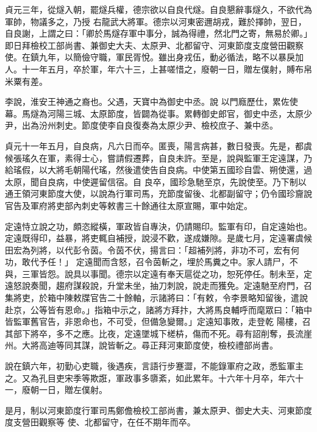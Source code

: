 \begin{pinyinscope}
 貞元三年，從燧入朝，罷燧兵權，德宗欲以自良代燧。自良懇辭事燧久，不欲代為軍帥，物議多之，乃授
 右龍武大將軍。德宗以河東密邇胡戎，難於擇帥，翌日，自良謝，上謂之曰：「卿於馬燧存軍中事分，誠為得禮，然北門之寄，無易於卿。」即日拜檢校工部尚書、兼御史大夫、太原尹、北都留守、河東節度支度營田觀察使。在鎮九年，以簡儉守職，軍民胥悅。雖出身戎伍，動必循法，略不以暴戾加人。十一年五月，卒於軍，年六十三，上甚嗟惜之，廢朝一日，贈左僕射，賻布帛米粟有差。



 李說，淮安王神通之裔也。父遇，天寶中為御史中丞。說
 以門廕歷仕，累佐使幕。馬燧為河陽三城、太原節度，皆闢為從事。累轉御史郎官，御史中丞，太原少尹，出為汾州刺史。節度使李自良復奏為太原少尹、檢校庶子、兼中丞。



 貞元十一年五月，自良病，凡六日而卒。匿喪，陽言病甚，數日發喪。先是，都虞候張瑤久在軍，素得士心，嘗請假遷葬，自良未許。至是，說與監軍王定遠謀，乃給瑤假，以大將毛朝陽代瑤，然後遣使告自良病。中使第五國珍自雲、朔使還，過太原，聞自良病，中使遲留信宿。自
 良卒，國珍急馳至京，先說使至。乃下制以通王領河東節度大使，以說為行軍司馬，充節度留後、北都副留守；仍令國珍齎說官告及軍府將吏部內刺史等敕書三十餘通往太原宣賜，軍中始定。



 定遠恃立說之功，頗恣縱橫，軍政皆自專決，仍請賜印。監軍有印，自定遠始也。定遠既得印，益暴，將吏輒自補授，說浸不歡，遂成嫌隙。是歲七月，定遠署虞候田宏為列將，以代彭令茵。令茵不伏，揚言曰：「超補列將，非功不可，宏有何功，敢代予任！」
 定遠聞而含怒，召令茵斬之，埋於馬糞之中。家人請尸，不與，三軍皆怨。說具以事聞。德宗以定遠有奉天扈從之功，恕死停任。制未至，定遠怒說奏聞，趨府謀殺說，升堂未坐，抽刀刺說，說走而獲免。定遠馳至府門，召集將吏，於箱中陳敕牒官告二十餘軸，示諸將曰：「有敕，令李景略知留後，遣說赴京，公等皆有恩命。」指箱中示之，諸將方拜抃，大將馬良輔呼而麾眾曰：「箱中皆監軍舊官告，非恩命也，不可受，但備急變爾。」定遠知事敗，走登乾
 陽樓，召其部下將卒，多不之應。比夜，定遠墜城下槎枿，傷而不死。尋有詔削奪，長流崖州。大將高迪等同其謀，說皆斬之。尋正拜河東節度使，檢校禮部尚書。



 說在鎮六年，初勤心吏職，後遇疾，言語行步蹇澀，不能錄軍府之政，悉監軍主之。又為孔目吏宋季等欺誑，軍政事多隳紊，如此累年。十六年十月卒，年六十一，廢朝一日，贈左僕射。



 是月，制以河東節度行軍司馬鄭儋檢校工部尚書，兼太原尹、御史大夫、河東節度度支營田觀察等
 使、北都留守，在任不期年而卒。




\end{pinyinscope}
